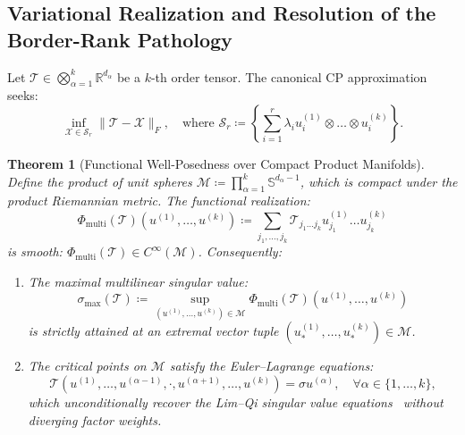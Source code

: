 \documentclass[11pt,a4paper,reqno]{amsart}
\newtheorem{theorem}{Theorem}[section]
\theoremstyle{definition}
\numberwithin{equation}{section}
\providecommand{\R}{\mathbb{R}}
\providecommand{\Sph}{\mathbb{S}}
\providecommand{\Sph}{\mathbb{S}}
\providecommand{\R}{\mathbb{R}}
\begin{document}
\subsection{Variational Realization and Resolution of the Border-Rank Pathology}
\label{subsec:tensors_border_rank}

Let $\mathcal{T} \in \bigotimes_{\alpha=1}^k \R^{d_\alpha}$ be a $k$-th order tensor. The canonical CP approximation seeks:
\begin{equation}
    \label{eq:cp_approx_problem}
    \inf_{\mathcal{X} \in \mathcal{S}_r} \|\mathcal{T} - \mathcal{X}\|_F, \quad \text{where } \mathcal{S}_r \coloneqq \left\{ \sum_{i=1}^r \lambda_i u_i^{(1)} \otimes \dots \otimes u_i^{(k)} \right\}.
\end{equation}

\begin{theorem}[Functional Well-Posedness over Compact Product Manifolds]
\label{thm:tensor_weierstrass}
Define the product of unit spheres $\mathcal{M} \coloneqq \prod_{\alpha=1}^k \Sph^{d_\alpha - 1}$, which is compact under the product Riemannian metric. The functional realization:
\begin{equation}
    \Phi_{\mathrm{multi}}(\mathcal{T})(u^{(1)}, \dots, u^{(k)}) \coloneqq \sum_{j_1, \dots, j_k} \mathcal{T}_{j_1 \dots j_k} u_{j_1}^{(1)} \dots u_{j_k}^{(k)}
\end{equation}
is smooth: $\Phi_{\mathrm{multi}}(\mathcal{T}) \in C^\infty(\mathcal{M})$. Consequently:
\begin{enumerate}[label=(\roman*)]
    \item The maximal multilinear singular value:
    \begin{equation}
        \sigma_{\max}(\mathcal{T}) \coloneqq \sup_{(u^{(1)}, \dots, u^{(k)}) \in \mathcal{M}} \Phi_{\mathrm{multi}}(\mathcal{T})(u^{(1)}, \dots, u^{(k)})
    \end{equation}
    is strictly attained at an extremal vector tuple $(u_*^{(1)}, \dots, u_*^{(k)}) \in \mathcal{M}$.
    \item The critical points on $\mathcal{M}$ satisfy the Euler--Lagrange equations:
    \begin{equation}
        \label{eq:tensor_critical}
        \mathcal{T}(u^{(1)}, \dots, u^{(\alpha-1)}, \cdot, u^{(\alpha+1)}, \dots, u^{(k)}) = \sigma u^{(\alpha)}, \quad \forall \alpha \in \{1, \dots, k\},
    \end{equation}
    which unconditionally recover the Lim--Qi singular value equations~\cite{lim2005singular,qi2005eigenvalues} without diverging factor weights.
\end{enumerate}
\end{theorem}
\end{document}
